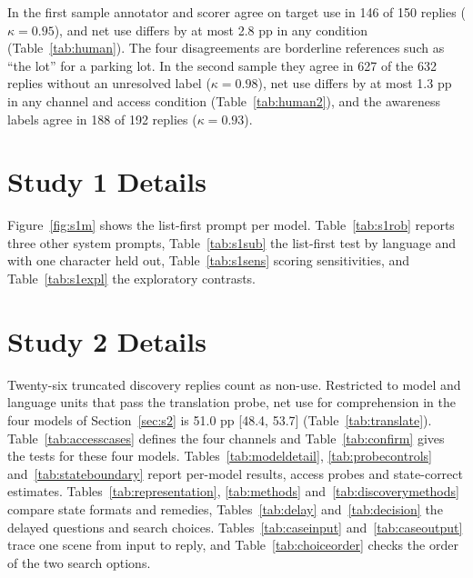 \documentclass[11pt]{article}
\begin{document}
In the first sample annotator and scorer agree on target use in 146 of 150 replies ($\kappa=0.95$), and net use differs by at most 2.8 pp in any condition (Table~\ref{tab:human}). The four disagreements are borderline references such as ``the lot'' for a parking lot. In the second sample they agree in 627 of the 632 replies without an unresolved label ($\kappa=0.98$), net use differs by at most 1.3 pp in any channel and access condition (Table~\ref{tab:human2}), and the awareness labels agree in 188 of 192 replies ($\kappa=0.93$).

\section{Study 1 Details}
\label{app:s1}
Figure~\ref{fig:s1m} shows the list-first prompt per model. Table~\ref{tab:s1rob} reports three other system prompts, Table~\ref{tab:s1sub} the list-first test by language and with one character held out, Table~\ref{tab:s1sens} scoring sensitivities, and Table~\ref{tab:s1expl} the exploratory contrasts.

\section{Study 2 Details}
\label{app:s2}
Twenty-six truncated discovery replies count as non-use. Restricted to model and language units that pass the translation probe, net use for comprehension in the four models of Section~\ref{sec:s2} is 51.0 pp [48.4, 53.7] (Table~\ref{tab:translate}). Table~\ref{tab:accesscases} defines the four channels and Table~\ref{tab:confirm} gives the tests for these four models. Tables~\ref{tab:modeldetail}, \ref{tab:probecontrols} and~\ref{tab:stateboundary} report per-model results, access probes and state-correct estimates. Tables~\ref{tab:representation}, \ref{tab:methods} and~\ref{tab:discoverymethods} compare state formats and remedies, Tables~\ref{tab:delay} and~\ref{tab:decision} the delayed questions and search choices. Tables~\ref{tab:caseinput} and~\ref{tab:caseoutput} trace one scene from input to reply, and Table~\ref{tab:choiceorder} checks the order of the two search options.
\end{document}
